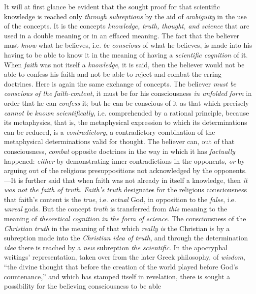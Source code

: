 \documentclass[12pt,a4paper]{book}
\begin{document}
It will at first glance be evident that the sought proof for that scientific knowledge is
reached only \emph{through subreptions} by the aid of \emph{ambiguity} in the use of the concepts. It
is the concepts \emph{knowledge, truth, thought, and science} that are used in a double meaning
or in an effaced meaning. The fact that the believer must \emph{know} what he believes, i.e.
\emph{be conscious} of what he believes, is made into his having to be able to know it in the
meaning of having a \emph{scientific cognition} of it. When \emph{faith} was not itself a \emph{knowledge},
it is said, then the believer would not be able to confess his faith and not be able to reject
and combat the erring doctrines. Here is again the same exchange of concepts. The believer \emph{must
be conscious of the faith-content}, it must be for his consciousness \emph{in unfolded form} in
order that he can \emph{confess} it; but he can be conscious of it as that which precisely \emph{cannot
be known scientifically}, i.e. comprehended by a rational principle, because its metaphysics,
that is, the metaphysical expression to which its determinations can be reduced, is a
\emph{contradictory}, a contradictory combination of the metaphysical determinations valid for
thought. The believer can, out of that consciousness, \emph{combat} opposite doctrines in the way in
which it has \emph{factually} happened: \emph{either} by demonstrating inner contradictions in the opponents,
\emph{or} by arguing out of the religious presuppositions not acknowledged by the opponents. ---It is
further said that when faith was not already in itself a knowledge, then \emph{it was not the
faith of truth}. \emph{Faith's truth} designates for the religious consciousness that faith's content
is the \emph{true}, i.e. \emph{actual} God, in opposition to the \emph{false}, i.e. \emph{unreal}
gods. But the concept \emph{truth} is transferred from \emph{this} meaning to the meaning of
\emph{theoretical cognition in the form of science}. The consciousness of the \emph{Christian truth}
in the meaning of that which \emph{really is} the Christian is by a subreption made into the
\emph{Christian idea of truth}, and through the determination \emph{idea} there is reached by a
\emph{new} subreption \emph{the scientific}. In the apocryphal writings' representation, taken
over from the later Greek philosophy, of \emph{wisdom}, ``the divine thought that before the
creation of the world played before God's countenance,'' and which has stamped itself in
revelation, there is sought a possibility for the believing consciousness to be able
\end{document}
